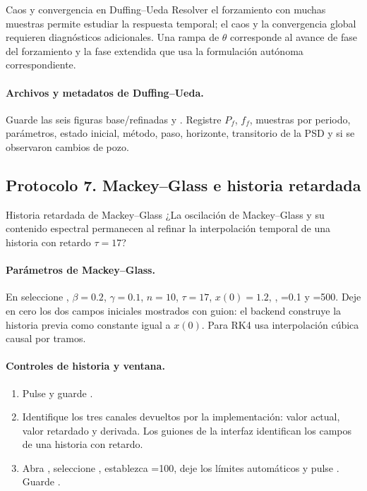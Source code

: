 \begin{cajaalerta}{Caos y convergencia en Duffing--Ueda}
Resolver el forzamiento con muchas muestras permite estudiar la respuesta temporal; el caos y la convergencia global requieren diagnósticos adicionales. Una rampa de \(\theta\) corresponde al avance de fase del forzamiento y
la fase extendida que usa la formulación autónoma correspondiente.
\end{cajaalerta}

\paragraph{Archivos y metadatos de Duffing--Ueda.}
Guarde las seis figuras base/refinadas y
. Registre \(P_f\), \(f_f\), muestras por
periodo, parámetros, estado inicial, método, paso, horizonte, transitorio de la
PSD y si se observaron cambios de pozo.

\subsection{Protocolo 7. Mackey--Glass e historia retardada}

\begin{cajaazul}{Historia retardada de Mackey--Glass}
¿La oscilación de Mackey--Glass y su contenido espectral permanecen al refinar
la interpolación temporal de una historia con retardo \(\tau=17\)?
\end{cajaazul}

\paragraph{Parámetros de Mackey--Glass.}
En  seleccione ,
\(\beta=0.2\), \(\gamma=0.1\), \(n=10\), \(\tau=17\),
\(x(0)=1.2\), , =0.1 y
=500. Deje en cero los dos campos iniciales mostrados con
guion: el backend construye la historia previa como constante igual a
\(x(0)\). Para RK4 usa interpolación cúbica causal por tramos.

\paragraph{Controles de historia y ventana.}
\begin{enumerate}
  \item Pulse  y guarde
  .
  \item Identifique los tres canales devueltos por la implementación: valor
  actual, valor retardado y derivada. Los guiones de la interfaz identifican
  los campos de una historia con retardo.
  \item Abra , seleccione
  , establezca
  =100, deje los límites automáticos y pulse
  . Guarde
  .
\end{enumerate}

